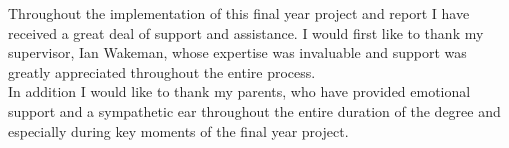 
\begin{acknowledgements}

Throughout the implementation of this final year project and report I have received a great deal of support and assistance. I would first like to thank my supervisor, Ian Wakeman, whose expertise was invaluable and support was greatly appreciated throughout the entire process. \\

In addition I would like to thank my parents, who have provided emotional support and a sympathetic ear throughout the entire duration of the degree and especially during key moments of the final year project.

\end{acknowledgements}
